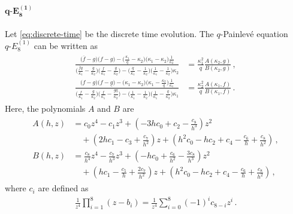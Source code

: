 \documentclass[11pt, a4paper]{article}
\theoremstyle{definition}
\begin{document}
\paragraph{$ \boldsymbol{q\text{-}E_8^{(1)}} $}
Let \eqref{eq:discrete-time} be the discrete time evolution. The $ q $-Painlev\'e equation $ q\text{-}E_8^{(1)} $ can be written as
\begin{align}
    \begin{aligned}\label{eq:qE8}
        \frac{\bigl(\overline{f}-g \bigr) \bigl(f-g\bigr) - \bigl(\frac{\kappa_1}{q}-\kappa_2\bigr)\bigl(\kappa_1-\kappa_2\bigr) \frac{1}{\kappa_2}}{\bigl( \frac{\overline{f}q}{\kappa_1} - \frac{g}{\kappa_2} \bigr) \bigl( \frac{f}{\kappa_1} - \frac{g}{\kappa_2} \bigr) - \bigl( \frac{q}{\kappa_1} - \frac{1}{\kappa_2} \bigr) \bigl( \frac{1}{\kappa_1} -\frac{1}{\kappa_2} \bigr) \kappa_2 } &= \frac{\kappa_1^2}{q} \frac{A(\kappa_2,g)}{B(\kappa_2,g)} \, , \\
        \frac{\bigl(f-g \bigr) \bigl(f-\underline{g}\bigr) - \bigl(\kappa_1-\kappa_2\bigr) \bigl(\kappa_1-\frac{\kappa_2}{q}\bigr) \frac{1}{\kappa_1} }{\bigl( \frac{f}{\kappa_1} - \frac{g}{\kappa_2} \bigr) \bigl( \frac{f}{\kappa_1} - \frac{\underline{g} q}{\kappa_2} \bigr) - \bigl( \frac{1}{\kappa_1}- \frac{1}{\kappa_2}\bigr) \bigl(\frac{1}{\kappa_1} - \frac{q}{\kappa_2}\bigr) \kappa_1} &= \frac{\kappa_2^2}{q} \frac{A(\kappa_1, f)}{B(\kappa_1, f)} \, .
    \end{aligned}
\end{align}
Here, the polynomials $ A $ and $ B $ are
\begin{align}
    \begin{aligned}
        A(h,z) &= c_0 z^4 - c_1 z^3 + \left( -3hc_0 + c_2 - \frac{c_8}{h^3} \right) z^2 \\
        &\quad + \left(2h c_1 - c_3 + \frac{c_7}{h^2} \right) z + \left( h^2 c_0 - h c_2 + c_4 - \frac{c_6}{h} + \frac{c_8}{h^2} \right) \, , \\
        B(h,z) &= \frac{c_8}{h^4} z^4 - \frac{c_7}{h^3} z^3 + \left( -h c_0 + \frac{c_6}{h^2} - \frac{3c_8}{h^3} \right) z^2 \\
        &\quad + \left( hc_1 - \frac{c_5}{h} + \frac{2c_7}{h^2} \right) z + \left( h^2 c_0 - h c_2 + c_4 - \frac{c_6}{h} + \frac{c_8}{h^2} \right) \, ,
    \end{aligned}
\end{align}
where $ c_i $ are defined as
\begin{align}
    \frac{1}{z^4} \prod_{i=1}^8 (z-b_i) = \frac{1}{z^4} \sum_{i=0}^8 (-1)^i c_{8-i} z^i \, .
\end{align}
\end{document}
